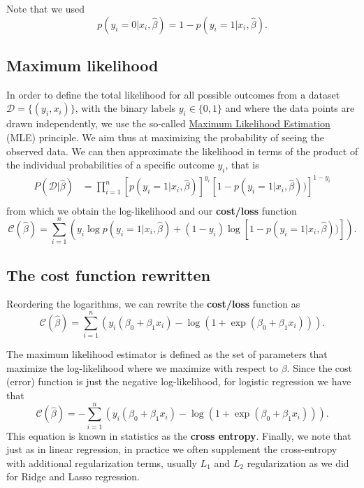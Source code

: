 \documentclass[%
oneside,                 %
final,                   %
10pt]{article}
\begin{document}
Note that we used
\[
p(y_i=0\vert x_i, \hat{\beta}) = 1-p(y_i=1\vert x_i, \hat{\beta}).
\]

\subsection{Maximum likelihood}

In order to define the total likelihood for all possible outcomes from a  
dataset $\mathcal{D}=\{(y_i,x_i)\}$, with the binary labels
$y_i\in\{0,1\}$ and where the data points are drawn independently, we use the so-called \href{{https://en.wikipedia.org/wiki/Maximum_likelihood_estimation}}{Maximum Likelihood Estimation} (MLE) principle. 
We aim thus at maximizing 
the probability of seeing the observed data. We can then approximate the 
likelihood in terms of the product of the individual probabilities of a specific outcome $y_i$, that is 
\begin{align*}
P(\mathcal{D}|\hat{\beta})& = \prod_{i=1}^n \left[p(y_i=1|x_i,\hat{\beta})\right]^{y_i}\left[1-p(y_i=1|x_i,\hat{\beta}))\right]^{1-y_i}\nonumber \\
\end{align*}
from which we obtain the log-likelihood and our \textbf{cost/loss} function
\[
\mathcal{C}(\hat{\beta}) = \sum_{i=1}^n \left( y_i\log{p(y_i=1|x_i,\hat{\beta})} + (1-y_i)\log\left[1-p(y_i=1|x_i,\hat{\beta}))\right]\right).
\]

\subsection{The cost function rewritten}

Reordering the logarithms, we can rewrite the \textbf{cost/loss} function as
\[
\mathcal{C}(\hat{\beta}) = \sum_{i=1}^n  \left(y_i(\beta_0+\beta_1x_i) -\log{(1+\exp{(\beta_0+\beta_1x_i)})}\right).
\]

The maximum likelihood estimator is defined as the set of parameters that maximize the log-likelihood where we maximize with respect to $\beta$.
Since the cost (error) function is just the negative log-likelihood, for logistic regression we have that
\[
\mathcal{C}(\hat{\beta})=-\sum_{i=1}^n  \left(y_i(\beta_0+\beta_1x_i) -\log{(1+\exp{(\beta_0+\beta_1x_i)})}\right).
\]
This equation is known in statistics as the \textbf{cross entropy}. Finally, we note that just as in linear regression, 
in practice we often supplement the cross-entropy with additional regularization terms, usually $L_1$ and $L_2$ regularization as we did for Ridge and Lasso regression.
\end{document}
